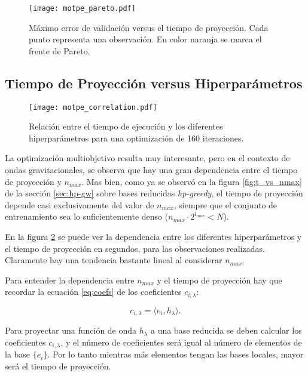 \begin{figure}[h!]
\centering
\texttt{[image: motpe\_pareto.pdf]}
\caption{Máximo error de validación versus el tiempo de proyección. Cada punto representa una observación. En color naranja se marca el frente de Pareto.}
\label{fig:pareto}
\end{figure}

\subsection{Tiempo de Proyección versus Hiperparámetros}
\label{sec:corr_t}

\begin{figure}[p]
\centering
\texttt{[image: motpe\_correlation.pdf]}
\caption{Relación entre el tiempo de ejecución y los diferentes hiperparámetros para una optimización de 160 iteraciones.}
\label{fig:motpe_param_rel}
\end{figure}


La optimización multiobjetivo resulta muy interesante, pero en el contexto de ondas gravitacionales, se observa que hay una gran dependencia entre el tiempo de proyección y $n_{max}$. Mas bien, como ya se observó en la figura \ref{fig:t_vs_nmax} de la sección \ref{sec:hp-gw} sobre bases reducidas \textit{hp-greedy}, el tiempo de proyección depende casi exclusivamente del valor de $n_{max}$, siempre que el conjunto de entrenamiento sea lo suficientemente denso \mbox{($n_{max} \cdot 2^{l_{max}} < N$).}

En la figura \ref{fig:motpe_param_rel} se puede ver la dependencia entre los diferentes hiperparámetros y el tiempo de proyección en segundos, para las observaciones realizadas. Claramente hay una tendencia bastante lineal al considerar $n_{max}$.

Para entender la dependencia entre $n_{max}$ y el tiempo de proyección hay que recordar la ecuación \eqref{eq:coefs} de los coeficientes $c_{i, \lambda}$:

\[
c_{i, \lambda} = \langle e_i, h_{\lambda} \rangle .
\]

Para proyectar una función de onda $h_{\lambda}$ a una base reducida se deben calcular los coeficientes $c_{i, \lambda}$, y el número de coeficientes será igual al número de elementos de la base $\{  e_i\}$. Por lo tanto mientras más elementos tengan las bases locales, mayor será el tiempo de proyección.

